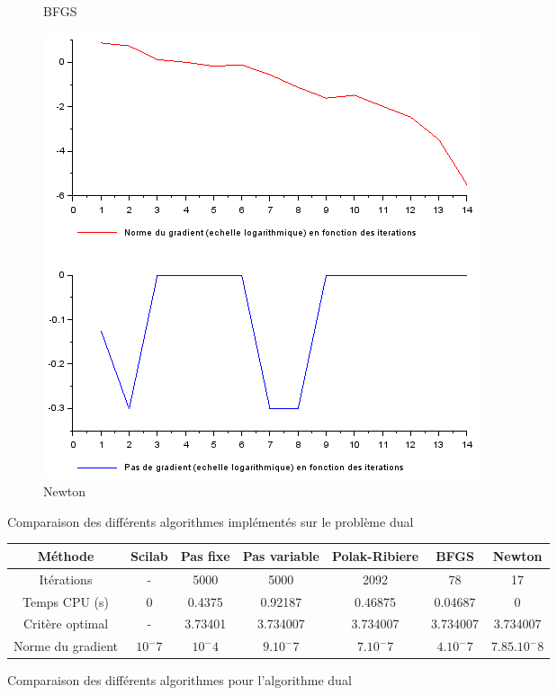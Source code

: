 \documentclass{article}
\begin{document}
\begin{figure}
\begin{subfigure}[t]{.4\textwidth}
                \caption{BFGS}
                \label{fig:BFGS_dual}
            \end{subfigure}
            \hfill
            \begin{subfigure}[t]{.4\textwidth}
                \includegraphics[width=\textwidth]{../Images/Newton_dual.png}
                \caption{Newton}
                \label{fig:Newton_dual}
            \end{subfigure}
            \caption{Comparaison des différents algorithmes implémentés sur le problème dual}
            \label{fig:courbes_dual}
        \end{figure}

     
        \begin{figure}
            \begin{tabular}{|c|cccccc|}
                \hline
                Méthode & Scilab & Pas fixe & Pas variable & Polak-Ribiere & BFGS & Newton \\
                \hline
                Itérations & - & 5000 & 5000 & 2092 & 78 & 17\\
                Temps CPU (s) & 0 & 0.4375 & 0.92187 & 0.46875 & 0.04687 & 0\\
                Critère optimal & - & 3.73401 & 3.734007 & 3.734007 & 3.734007 & 3.734007\\
                Norme du gradient & $10^-7$ & $10^-4$ & $9.10^-7$ & $7.10^-7$ & $4.10^-7$ & $7.85.10^-8$\\
                \hline
                \end{tabular}
            \caption{Comparaison des différents algorithmes pour l'algorithme dual}
            \label{comparAlgodual}
        \end{figure}
    
\end{document}
